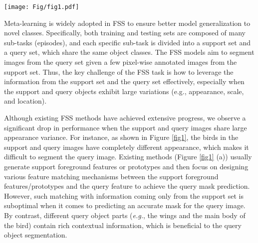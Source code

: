\documentclass{bmvc2k}
\begin{document}
\begin{figure*}[!h]
	\centering
	\texttt{[image: Fig/fig1.pdf]}
	\caption{Comparison between (a) previous typical few-shot segmentation (FSS) methods and (b) the proposed support-induced graph convolutional network (SiGCN). (a) Previous FSS methods focus on designing effective feature matching mechanism between support prototypes/features and query feature. However, such matching techniques usually fail to work when the support and query objects exhibit large appearance variations. (b) Our SiGCN aims to address the appearance variation problem by explicitly mining query context information. Based on the activation map, SiGCN constructs a query graph to associate salient query object parts. Then the support prototypes are introduced to guide the graph updating process for effective query context excavation.}
	\label{fig1}
\end{figure*}

Meta-learning \cite{shaban2017one} is widely adopted in FSS to ensure better model generalization to novel classes. Specifically, both training and testing sets are composed of many sub-tasks (episodes), and each specific sub-task is divided into a support set and a query set, which share the same object classes. The FSS models aim to segment images from the query set given a few pixel-wise annotated images from the support set. Thus, the key challenge of the FSS task is how to leverage the information from the support set and the query set effectively, especially when the support and query objects exhibit large variations (e.g., appearance, scale, and location).

Although existing FSS methods \cite{tian2020prior, min2021hypercorrelation, zhang2021few} have achieved extensive progress, we observe a significant drop in performance when the support and query images share large appearance variance. For instance,
as shown in Figure \ref{fig1}, the birds in the support and query images have completely different appearance, which makes it difficult to segment the query image. Existing methods (Figure \ref{fig1} (a)) usually generate support foreground features or prototypes and then focus on designing various feature matching mechanisms between the support foreground features/prototypes and the query feature to achieve the query mask prediction. However, such matching with information coming only from the support set is suboptimal when it comes to predicting an accurate mask for the query image. By contrast, different query object parts (\textit{e.g.}, the wings and the main body of the bird) contain rich contextual information, which is beneficial to the query object segmentation. 
\end{document}
